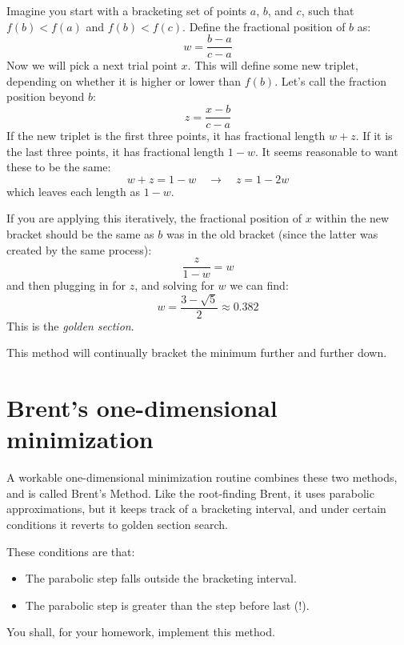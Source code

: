Imagine you start with a bracketing set of points $a$, $b$, and $c$,
such that $f(b)<f(a)$ and $f(b)<f(c)$. Define the fractional position
of $b$ as:
\begin{equation}
w = \frac{b-a}{c-a}
\end{equation}
Now we will pick a next trial point $x$. This will define some new
triplet, depending on whether it is higher or lower than $f(b)$. Let's
call the fraction position beyond $b$:
\begin{equation}
z = \frac{x-b}{c-a}
\end{equation}
If the new triplet is the first three points, it has fractional length
$w+z$. If it is the last three points, it has fractional length
$1-w$. It seems reasonable to want these to be the same:
\begin{equation}
w+z = 1 - w \quad\rightarrow\quad z = 1 - 2w
\end{equation}
which leaves each length as $1-w$. 

If you are applying this iteratively, the fractional position of $x$
within the new bracket should be the same as $b$ was in the old
bracket (since the latter was created by the same process):
\begin{equation}
\frac{z}{1-w} = w
\end{equation}
and then plugging in for $z$, and solving for $w$ we can find:
\begin{equation}
w = \frac{3-\sqrt{5}}{2} \approx 0.382
\end{equation}
This is the {\it golden section}.

This method will continually bracket the minimum further and further
down. 

\section{Brent's one-dimensional minimization}

A workable one-dimensional minimization routine combines these two
methods, and is called Brent's Method. Like the root-finding Brent, it
uses parabolic approximations, but it keeps track of a bracketing
interval, and under certain conditions it reverts to golden section
search.

These conditions are that:
\begin{itemize}
\item The parabolic step falls outside the  bracketing interval.
\item The parabolic step is greater than the step before last (!).
\end{itemize}

You shall, for your homework, implement this method.
